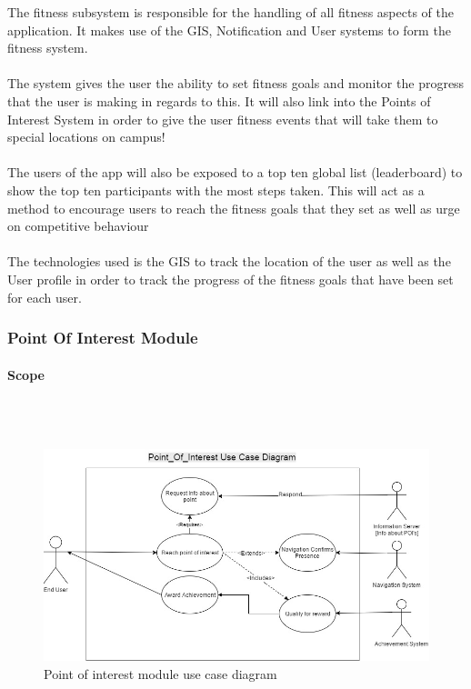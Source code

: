 \documentclass{article}
\begin{document}
			{The fitness subsystem is responsible for the handling of all fitness aspects of the application. It makes use of the GIS, Notification and User systems to form the fitness system.\\\\The system gives the user the ability to set fitness goals and monitor the progress that the user is making in regards to this. It will also link into the Points of Interest System in order to give the user fitness events that will take them to special locations on campus!\\\\The users of the app will also be exposed to a top ten global list (leaderboard) to show the top ten participants with the most steps taken. This will act as a method to encourage users to reach the fitness goals that they set as well as urge on competitive behaviour\\\\The technologies used is the GIS to track the location of the user as well as the User profile in order to track the progress of the fitness goals that have been set for each user.}		
		
		\subsubsection{Point Of Interest Module}
				\paragraph {Scope}\mbox{} \\\\
				\begin{figure}[h]
			            \includegraphics[width=\textwidth]{./Images/POI_Usecase.jpg} 
			            \caption{Point of interest module use case diagram}
			        \end{figure}
\end{document}
